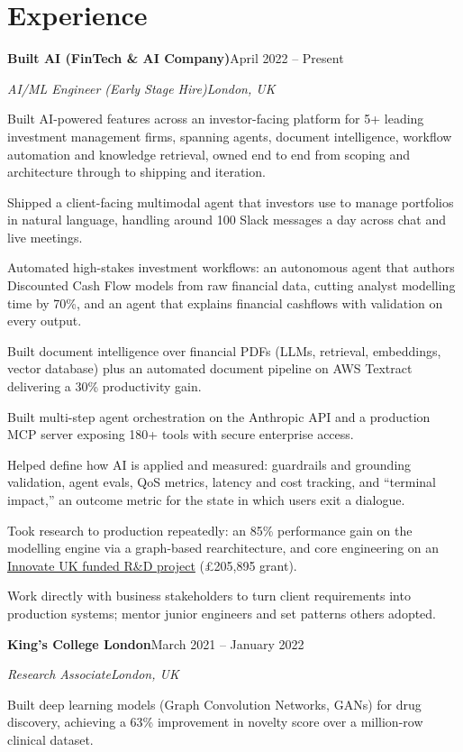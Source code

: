 \documentclass[10pt,a4paper]{article}
\newcommand{\entry}[4]{%
  {\color{company}\bfseries #1}\hfill {\color{muted}#2}\par
  \vspace{1pt}
  {\itshape #3}\hfill {\color{muted}\itshape #4}\par
  \vspace{3pt}%
}
\begin{document}
\section{Experience}
\entry{Built AI (FinTech \& AI Company)}{April 2022 -- Present}{AI/ML Engineer (Early Stage Hire)}{London, UK}
\begin{tight}
  \item Built AI-powered features across an investor-facing platform for 5+ leading investment management firms, spanning agents, document intelligence, workflow automation and knowledge retrieval, owned end to end from scoping and architecture through to shipping and iteration.
  \item Shipped a client-facing multimodal agent that investors use to manage portfolios in natural language, handling around 100 Slack messages a day across chat and live meetings.
  \item Automated high-stakes investment workflows: an autonomous agent that authors Discounted Cash Flow models from raw financial data, cutting analyst modelling time by 70\%, and an agent that explains financial cashflows with validation on every output.
  \item Built document intelligence over financial PDFs (LLMs, retrieval, embeddings, vector database) plus an automated document pipeline on AWS Textract delivering a 30\% productivity gain.
  \item Built multi-step agent orchestration on the Anthropic API and a production MCP server exposing 180+ tools with secure enterprise access.
  \item Helped define how AI is applied and measured: guardrails and grounding validation, agent evals, QoS metrics, latency and cost tracking, and ``terminal impact,'' an outcome metric for the state in which users exit a dialogue.
  \item Took research to production repeatedly: an 85\% performance gain on the modelling engine via a graph-based rearchitecture, and core engineering on an \href{https://gtr.ukri.org/projects?ref=10022996}{Innovate UK funded R\&D project} (\pounds205,895 grant).
  \item Work directly with business stakeholders to turn client requirements into production systems; mentor junior engineers and set patterns others adopted.
\end{tight}

\entry{King's College London}{March 2021 -- January 2022}{Research Associate}{London, UK}
\begin{tight}
  \item Built deep learning models (Graph Convolution Networks, GANs) for drug discovery, achieving a 63\% improvement in novelty score over a million-row clinical dataset.
\end{tight}
\end{document}
